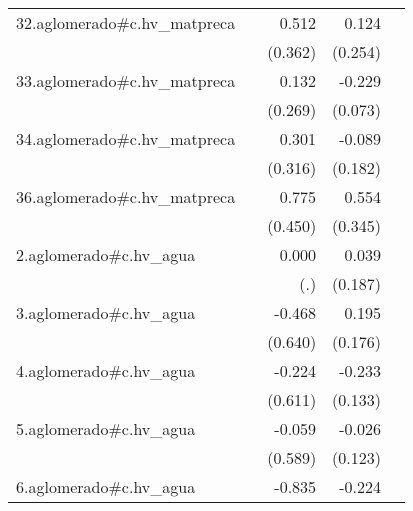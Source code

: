 {\begin{longtable}{l*{4}{D{.}{.}{-1}}}
\addlinespace
32.aglomerado#c.hv\_matpreca&                     &       0.512         &       0.124         &                     \\
            &                     &     (0.362)         &     (0.254)         &                     \\
\addlinespace
33.aglomerado#c.hv\_matpreca&                     &       0.132         &      -0.229\sym{**} &                     \\
            &                     &     (0.269)         &     (0.073)         &                     \\
\addlinespace
34.aglomerado#c.hv\_matpreca&                     &       0.301         &      -0.089         &                     \\
            &                     &     (0.316)         &     (0.182)         &                     \\
\addlinespace
36.aglomerado#c.hv\_matpreca&                     &       0.775         &       0.554         &                     \\
            &                     &     (0.450)         &     (0.345)         &                     \\
\addlinespace
2.aglomerado#c.hv\_agua&                     &       0.000         &       0.039         &                     \\
            &                     &         (.)         &     (0.187)         &                     \\
\addlinespace
3.aglomerado#c.hv\_agua&                     &      -0.468         &       0.195         &                     \\
            &                     &     (0.640)         &     (0.176)         &                     \\
\addlinespace
4.aglomerado#c.hv\_agua&                     &      -0.224         &      -0.233         &                     \\
            &                     &     (0.611)         &     (0.133)         &                     \\
\addlinespace
5.aglomerado#c.hv\_agua&                     &      -0.059         &      -0.026         &                     \\
            &                     &     (0.589)         &     (0.123)         &                     \\
\addlinespace
6.aglomerado#c.hv\_agua&                     &      -0.835         &      -0.224         &                     \\

\end{longtable}}
